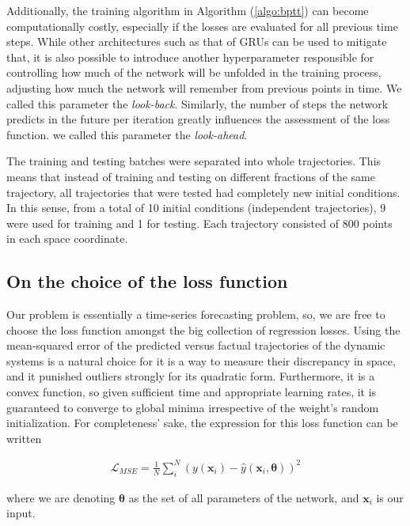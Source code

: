 Additionally, the training algorithm in Algorithm (\ref{algo:bptt}) can become computationally costly, especially if the losses are evaluated for all previous time steps. While other architectures such as that of GRUs can be used to mitigate that, it is also possible to introduce another hyperparameter responsible for controlling how much of the network will be unfolded in the training process, adjusting how much the network will remember from previous points in time. We called this parameter the \emph{look-back}. Similarly, the number of steps the network predicts in the future per iteration greatly influences the assessment of the loss function. we called this parameter the \emph{look-ahead}.

The training and testing batches were separated into whole trajectories. This means that instead of training and testing on different fractions of the same trajectory, all trajectories that were tested had completely new initial conditions. In this sense, from a total of 10 initial conditions (independent trajectories), 9 were used for training and 1 for testing. Each trajectory consisted of 800 points in each space coordinate.

\subsection{On the choice of the loss function}  \label{sec:loss_funct}

Our problem is essentially a time-series forecasting problem, so, we are free to choose the loss function amongst the big collection of regression losses. Using the mean-squared error of the predicted versus factual trajectories of the dynamic systems is a natural choice for it is a way to measure their discrepancy in space, and it punished outliers strongly for its quadratic form. Furthermore, it is a convex function, so given sufficient time and appropriate learning rates, it is guaranteed to converge to global minima irrespective of the weight's random initialization. For completeness' sake, the expression for this loss function can be written 

\begin{align}
    \mathcal{L}_{MSE} = \frac{1}{N}\sum_{i}^N (y(\mathbf{x}_i) - \hat{y}(\mathbf{x}_i, \mathbf{\theta}))^2
    \label{eq:mse_loss}
\end{align}

where we are denoting $\mathbf{\theta}$ as the set of all parameters of the network, and $\mathbf{x}_i$ is our input. 

